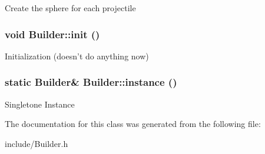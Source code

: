 \label{class_builder_a24f7e21014e2bb924abd4e2a519a1688}
Create the sphere for each projectile \hypertarget{class_builder_ae10ac2d3acc2011587c48bc06ad33984}{
\subsubsection[{init}]{\setlength{\rightskip}{0pt plus 5cm}void Builder::init ()}}
\label{class_builder_ae10ac2d3acc2011587c48bc06ad33984}
Initialization (doesn't do anything now) \hypertarget{class_builder_a260f9354517188703f594305928e50a2}{
\subsubsection[{instance}]{\setlength{\rightskip}{0pt plus 5cm}static {\bf Builder}\& Builder::instance ()}}
\label{class_builder_a260f9354517188703f594305928e50a2}
Singletone Instance 

The documentation for this class was generated from the following file:\begin{DoxyCompactItemize}
\item 
include/Builder.h\end{DoxyCompactItemize}
